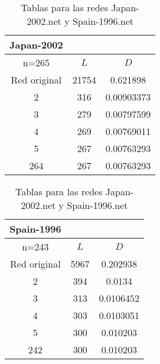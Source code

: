 \begin{table}[H]
  \begin{minipage}{0.45\textwidth}
    \begin{tabular}{ccc}
      Japan-2002 & & \\
      \hline
      n=265              &   $L$ &   $D$ \\
      \hline
      Red original &               21754 & 0.621898   \\
      2            &                 316 & 0.00903373 \\
      3            &                 279 & 0.00797599 \\
      4            &                 269 & 0.00769011 \\
      5            &                 267 & 0.00763293 \\
      264          &                 267 & 0.00763293 \\
      \hline
    \end{tabular}
  \end{minipage}
  \begin{minipage}{0.45\textwidth}
    \begin{tabular}{ccc}
      Spain-1996 & & \\
      \hline
      n=243              &   $L$ &   $D$ \\
      \hline
      Red original &                5967 &  0.202938  \\
      2            &                 394 &  0.0134    \\
      3            &                 313 &  0.0106452 \\
      4            &                 303 &  0.0103051 \\
      5            &                 300 &  0.010203  \\
      242          &                 300 &  0.010203  \\
      \hline
    \end{tabular}
  \end{minipage}
  \label{jp-sp}
  \caption{Tablas para las redes Japan-2002.net y Spain-1996.net}
\end{table}
